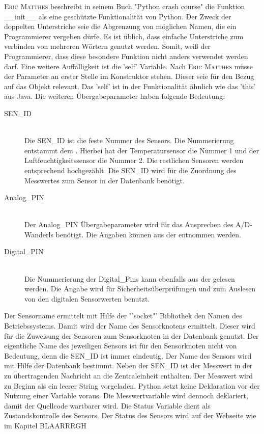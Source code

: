 	\textsc{Eric Matthes} beschreibt in seinem Buch "Python crash course"\cite{1593276036} die Funktion \_\_init\_\_ als eine geschützte Funktionalität von Python. Der Zweck der doppelten Unterstriche seie die Abgrenzung von möglichen Namen, die ein Programmierer vergeben dürfe. Es ist üblich, dass einfache Unterstriche zum verbinden von mehreren Wörtern genutzt werden. Somit, weiß der Programmierer, dass diese besondere Funktion nicht anders verwendet werden darf. Eine weitere Auffälligkeit ist die 'self' Variable. Nach \textsc{Eric Matthes} müsse der Parameter an erster Stelle im Konstruktor stehen. Dieser seie für den Bezug auf das Objekt relevant. Das 'self' ist in der Funktionalität ähnlich wie das 'this' aus Java. Die weiteren Übergabeparameter haben folgende Bedeutung:
	\begin{description}
		\item[SEN\_ID] \hfill \\
			Die SEN\_ID ist die feste Nummer des Sensors. Die Nummerierung entstammt dem . Hierbei hat der Temperatursensor die Nummer 1 und der Luftfeuchtigkeitssensor die Nummer 2. Die restlichen Sensoren werden entsprechend hochgezählt. Die SEN\_ID wird für die Zuordnung des Messwertes zum Sensor in der Datenbank benötigt. 
		\item[Analog\_PIN] \hfill \\
			Der Analog\_PIN Übergabeparameter wird für das Ansprechen des A/D-Wanderls benötigt. Die Angaben können aus der  entnommen werden.
		\item[Digital\_PIN] \hfill \\
			Die Nummerierung der Digital\_Pins kann ebenfalls aus der  gelesen werden. Die Angabe wird für Sicherheitsüberprüfungen und zum Auslesen von den digitalen Sensorwerten benutzt.
   	\end{description}
	Der Sensorname ermittelt mit Hilfe der "'socket"' Bibliothek den Namen des Betriebssystems. Damit wird der Name des Sensorknotens ermittelt. Dieser wird für die Zuweisung der Sensoren zum Sensorknoten in der Datenbank genutzt. Der eigentliche Name des jeweiligen Sensors ist für den Sensorknoten nicht von Bedeutung, denn die SEN\_ID ist immer eindeutig. Der Name des Sensors wird mit Hilfe der Datenbank bestimmt.
	Neben der SEN\_ID ist der Messwert in der zu übertragenden Nachricht an die Zentraleinheit enthalten. Der Messwert wird zu Beginn als ein leerer String vorgeladen. Python setzt keine Deklaration vor der Nutzung einer Variable voraus. Die Messwertvariable wird dennoch deklariert, damit der Quellcode wartbarer wird. Die Status Variable dient als Zustandskontrolle des Sensors. Der Status des Sensors wird auf der Webseite wie im Kapitel BLAARRRGH %
